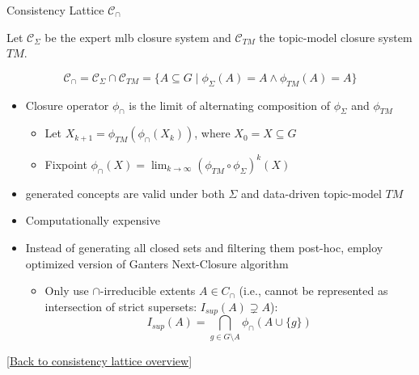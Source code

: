 \begin{frame}{Consistency Lattice $\mathcal{C}_{\cap}$}
\hypertarget{appendix:consistency-detail}{}

    Let $\mathcal{C}_{\Sigma}$ be the expert \ac{mlb} closure system and $\mathcal{C}_{TM}$ the topic-model closure system $TM$. 

\[
\mathcal{C}_{\cap}
= \mathcal{C}_{\Sigma}\cap\mathcal{C}_{TM}
= \{A\subseteq G \mid \phi_{\Sigma}(A)=A \land \phi_{TM}(A)=A\}
\]

\begin{itemize}
  \item Closure operator $\phi_{\cap}$ is the limit of alternating composition of $\phi_{\Sigma}$ and $\phi_{TM}$
  \begin{itemize}
    \item Let $X_{k+1} =\phi_{TM}(\phi_{\cap}(X_k))$, where $X_0 = X \subseteq G$
  \item Fixpoint $\phi_\cap(X) = \lim_{k\to\infty} (\phi_{TM} \circ \phi_\Sigma)^k(X)$
  \end{itemize}
  \item[$\rightarrow$] generated concepts are valid under both $\Sigma$ and data-driven topic-model $TM$
  \vspace{1em}
  \item[\danger] Computationally expensive
  \item[$\rightarrow$] Instead of generating all closed sets and filtering them post-hoc, employ optimized version of Ganters Next-Closure algorithm
  \begin{itemize}
    \item Only use $\cap$-irreducible extents $A \in C_{\cap}$ (i.e., cannot be represented as intersection of strict supersets: $I_{sup}(A) \supsetneq A$):
    \[
    I_{sup}(A) = \bigcap_{g \in G \setminus A} \phi_\cap(A \cup \{g\})
    \]
  \end{itemize}
\end{itemize}
\vfill
{\tiny[\hyperlink{main:consistency-overview}{Back to consistency lattice overview}]}
\end{frame}


